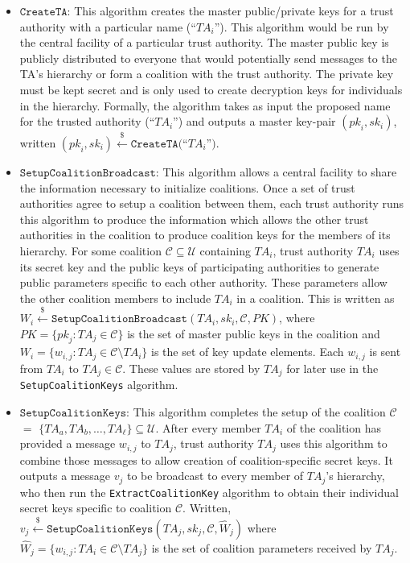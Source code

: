 \documentclass{IEEEtran}
\newcommand{\C}{\mathcal{C}}
\newcommand{\U}{\mathcal{U}}
\newcommand{\TA}{\mathit{TA}}
\newcommand{\pk}{\mathit{pk}}
\newcommand{\sk}{\mathit{sk}}
\newcommand{\getsr}{\stackrel{{\scriptscriptstyle\$}}{\gets}}
\begin{document}
\begin{itemize}

\item $\texttt{CreateTA}$: This algorithm creates the master
 public/private keys for a trust authority with a particular
 name (``$\TA_i$''). This algorithm would be run by the central
 facility of a particular trust authority. The master public key
 is publicly distributed to everyone that would potentially send
 messages to the TA's hierarchy or form a coalition with the
 trust authority. The private key must be kept secret and is
 only used to create decryption keys for individuals in the
 hierarchy. Formally, the algorithm takes as input the proposed
 name for the trusted authority (``$\TA_i$'') and outputs a
 master key-pair $(\pk_i, \sk_i)$, written $(\pk_i, \sk_i)
 \getsr \texttt{CreateTA}($``$\TA_i$''$)$.
\medskip

\item $\texttt{SetupCoalitionBroadcast}$: This algorithm allows a
central facility to share the information necessary to
initialize coalitions. Once a set of trust authorities agree to
setup a coalition between them, each trust authority runs this
algorithm to produce the information which allows the other
trust authorities in the coalition to produce coalition keys for
the members of its hierarchy. For some coalition $\C \subseteq
\U$ containing $\TA_i$, trust authority $\TA_i$ uses its secret
key and the public keys of participating authorities to generate
public parameters specific to each other authority. These
parameters allow the other coalition members to include $\TA_i$
in a coalition. This is written as $W_{i} \getsr
\texttt{SetupCoalitionBroadcast}(\TA_i,sk_{i}, \C, PK)$, where
$PK=\{\pk_{j}:\TA_{j}\in\C\}$ is the set of master public keys
in the coalition and $W_{i}=\{w_{i,j} : \TA_{j} \in \C \setminus
\TA_{i}\}$ is the set of key update elements. Each $w_{i,j}$ is sent from
$\TA_i$ to $\TA_j\in \C$. These values are stored by $\TA_j$ for
later use in the \texttt{SetupCoalitionKeys} algorithm.
\medskip

\item $\texttt{SetupCoalitionKeys}$: This algorithm completes the
setup of the coalition $\C$ $=$ $\{\TA_a, \TA_b, \ldots,
\TA_{\ell}\} \subseteq \U$. After every member $\TA_{i}$ of the coalition has
provided a message $w_{i,j}$ to $\TA_j$, trust authority $\TA_j$
uses this algorithm to combine those messages to allow creation
of coalition-specific secret keys. It outputs a message $v_j$ to
be broadcast to every member of $\TA_j$'s hierarchy, who then
run the \texttt{ExtractCoalitionKey} algorithm to obtain their
individual secret keys specific to coalition $\C$. Written, $v_j
\getsr \texttt{SetupCoalitionKeys}(\TA_j,sk_j,
\C, \hat{W}_{j})$ where $\hat{W}_{j} = \{w_{i,j} : \TA_i \in \C \setminus
\TA_j\}$ is the set of coalition parameters received by
$\TA_{j}$.\medskip

\end{itemize}
\end{document}
